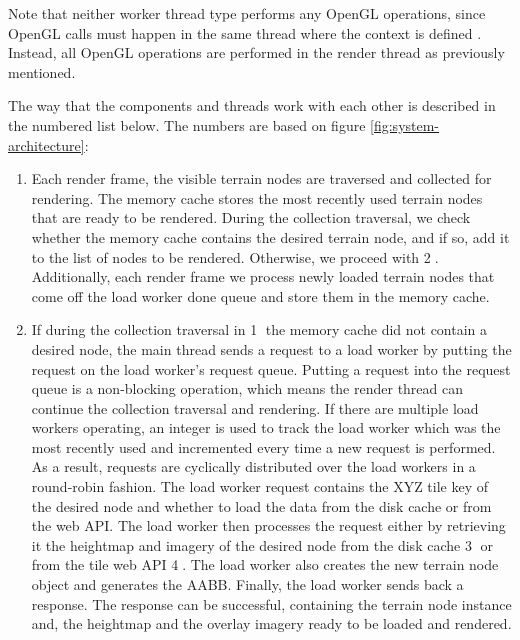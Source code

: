 Note that neither worker thread type performs any OpenGL operations, 
since OpenGL calls must happen in the same thread where 
the context is defined \cite{appledevopengl}. Instead, 
all OpenGL operations are performed in the render thread as previously mentioned.

The way that the components and threads work with each other is described in the numbered list below.
The numbers are based on figure \ref{fig:system-architecture}:
\begin{enumerate}[label=\textcircled{\arabic*}]
  \item Each render frame, the visible terrain nodes are traversed and collected for rendering.
        The memory cache stores the most recently used terrain nodes that are ready to be rendered.
        During the collection traversal, we check whether the memory cache contains 
        the desired terrain node, and if so, add it to the list of nodes to be rendered.
        Otherwise, we proceed with \textcircled{2}. Additionally, 
        each render frame we process newly loaded terrain nodes that come off the load worker done queue
        and store them in the memory cache.
  \item If during the collection traversal in \textcircled{1} the memory cache did not contain a desired node, 
        the main thread sends a request to a load worker by putting the request 
        on the load worker's request queue.
        Putting a request into the request queue is a non-blocking operation, 
        which means the render thread can continue the collection traversal and rendering. 
        If there are multiple load workers operating, an 
        integer is used to track the load worker which was the most recently used 
        and incremented every time a new request is performed. As a result,
        requests are cyclically distributed over the load workers in a 
        round-robin fashion. The load worker request contains the XYZ tile key of the desired node
        and whether to load the data from the disk cache or from the web API.
        The load worker then processes the request either by retrieving it the heightmap and imagery 
        of the desired node
        from the disk cache \textcircled{3} or from the tile web API \textcircled{4}.
        The load worker also creates the new terrain node object and generates the 
        AABB. Finally, the load worker sends back a response.
        The response can be successful, containing the terrain node instance and, the heightmap and the overlay imagery
        ready to be loaded and rendered.

\end{enumerate}
